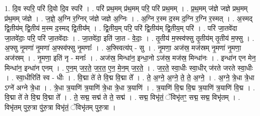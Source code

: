 \documentclass[17pt]{extarticle}
\begin{document}
1. दि॒व स्परि॒ परि॑ दि॒वो दि॒व स्परि॑ । . परि॑ प्रथ॒मम् प्र॑थ॒मम् परि॒ परि॑ प्रथ॒मम् । . प्र॒थ॒मम् ज॑ज्ञे जज्ञे प्रथ॒मम् प्र॑थ॒मम् ज॑ज्ञे । . ज॒ज्ञे॒ अ॒ग्नि र॒ग्निर् ज॑ज्ञे जज्ञे अ॒ग्निः । . अ॒ग्नि र॒स्म द॒स्म द॒ग्नि र॒ग्नि र॒स्मत् । . अ॒स्मद् द्वि॒तीय॑म् द्वि॒तीय॑ म॒स्म द॒स्मद् द्वि॒तीय᳚म् । . द्वि॒तीय॒म् परि॒ परि॑ द्वि॒तीय॑म् द्वि॒तीय॒म् परि॑ । . परि॑ जा॒तवे॑दा जा॒तवे॑दाः॒ परि॒ परि॑ जा॒तवे॑दाः । . जा॒तवे॑दा॒ इति॑ जा॒त - वे॒दाः॒ । . तृ॒तीय॑ म॒फ्स्व॑फ्सु तृ॒तीय॑म् तृ॒तीय॑ म॒फ्सु । . अ॒फ्सु नृ॒मणा॑ नृ॒मणा॑ अ॒फ्स्व॑फ्सु नृ॒मणाः᳚ । . अ॒फ्स्वित्य॑प् - सु । . नृ॒मणा॒ अज॑स्र॒ मज॑स्रम् नृ॒मणा॑ नृ॒मणा॒ अज॑स्रम् । . नृ॒मणा॒ इति॑ नृ - मनाः᳚ । . अज॑स्र॒ मिन्धा॑न॒ इन्धा॒नो ऽज॑स्र॒ मज॑स्र॒ मिन्धा॑नः । . इन्धा॑न एन मेन॒ मिन्धा॑न॒ इन्धा॑न एनम् । . ए॒न॒म् ज॒र॒ते॒ ज॒र॒त॒ ए॒न॒ मे॒न॒म् ज॒र॒ते॒ । . ज॒र॒ते॒ स्वा॒धीः स्वा॒धीर् ज॑रते जरते स्वा॒धीः । . स्वा॒धीरिति॑ स्व - धीः । . वि॒द्मा ते॑ ते वि॒द्म वि॒द्मा ते᳚ । . ते॒ अ॒ग्ने॒ अ॒ग्ने॒ ते॒ ते॒ अ॒ग्ने॒ । . अ॒ग्ने॒ त्रे॒धा त्रे॒धा ऽग्ने॑ अग्ने त्रे॒धा । . त्रे॒धा त्र॒याणि॑ त्र॒याणि॑ त्रे॒धा त्रे॒धा त्र॒याणि॑ । . त्र॒याणि॑ वि॒द्म वि॒द्म त्र॒याणि॑ त्र॒याणि॑ वि॒द्म । . वि॒द्मा ते॑ ते वि॒द्म वि॒द्मा ते᳚ । . ते॒ सद्म॒ सद्म॑ ते ते॒ सद्म॑ । . सद्म॒ विभृ॑तं॒ ॅविभृ॑तꣳ॒॒ सद्म॒ सद्म॒ विभृ॑तम् । . विभृ॑तम् पुरु॒त्रा पु॑रु॒त्रा विभृ॑तं॒ ॅविभृ॑तम् पुरु॒त्रा । \newline
\end{document}

